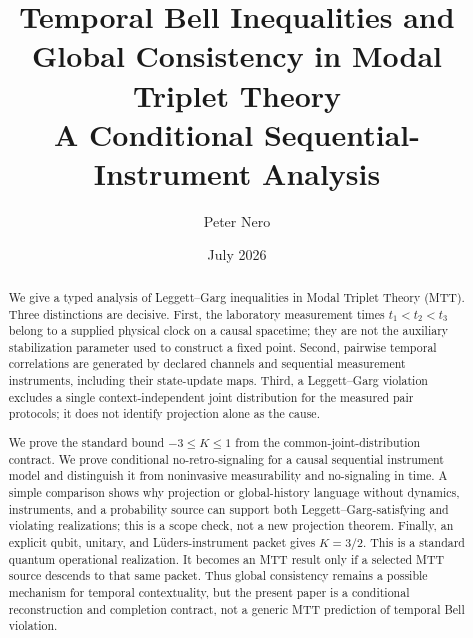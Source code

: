 \documentclass[11pt]{article}
\title{Temporal Bell Inequalities and Global Consistency in Modal Triplet Theory\\
\large A Conditional Sequential-Instrument Analysis}
\author{Peter Nero}
\date{July 2026}
\theoremstyle{definition}
\theoremstyle{remark}
\begin{document}
\maketitle

\begin{abstract}
We give a typed analysis of Leggett--Garg inequalities in Modal Triplet
Theory (MTT).  Three distinctions are decisive.  First, the laboratory
measurement times $t_1<t_2<t_3$ belong to a supplied physical clock on a
causal spacetime; they are not the auxiliary stabilization parameter used
to construct a fixed point.  Second, pairwise temporal correlations are
generated by declared channels and sequential measurement instruments,
including their state-update maps.  Third, a Leggett--Garg violation
excludes a single context-independent joint distribution for the measured
pair protocols; it does not identify projection alone as the cause.

We prove the standard bound $-3\leq K\leq1$ from the common-joint-distribution
contract.  We prove conditional no-retro-signaling for a causal sequential
instrument model and distinguish it from noninvasive measurability and
no-signaling in time.  A simple comparison shows why projection or
global-history language without dynamics, instruments, and a probability
source can support both Leggett--Garg-satisfying and violating realizations;
this is a scope check, not a new projection theorem.  Finally, an explicit
qubit, unitary, and L\"uders-instrument packet gives
$K=3/2$.  This is a standard quantum operational realization.  It becomes
an MTT result only if a selected MTT source descends to that same packet.
Thus global consistency remains a possible mechanism for temporal
contextuality, but the present paper is a conditional reconstruction and
completion contract, not a generic MTT prediction of temporal Bell
violation.
\end{abstract}
\end{document}
